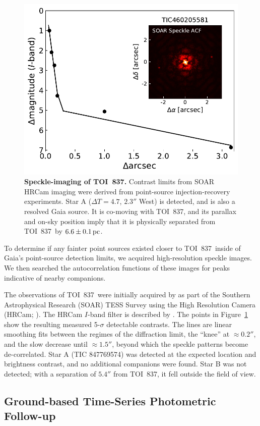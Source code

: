 \documentclass[12pt,twocolumn,tighten]{aastex63}
\newcommand{\tn}{TOI~837} %
\begin{document}
\begin{figure}[!t]
	\begin{center}
		\leavevmode
		\includegraphics[width=.44\textwidth]{f3.pdf}
	\end{center}
	\vspace{-0.7cm}
	\caption{
		{\bf Speckle-imaging of \tn.} Contrast limits from SOAR HRCam
		imaging were derived from point-source injection-recovery
		experiments. Star A ($\Delta T=4.7$, $2.3''$ West) is detected,
		and is also a resolved Gaia source.  It is co-moving with \tn, and
		its parallax and on-sky position imply that it is physically
		separated from \tn\ by $6.6\pm 0.1\,{\rm pc}$.
		\label{fig:speckle}
	}
\end{figure}

To determine if any fainter point sources existed closer to \tn\
inside of Gaia's point-source detection limits, we acquired
high-resolution speckle images. We then searched the autocorrelation
functions of these images for peaks indicative of nearby companions.

The observations of \tn\ were initially acquired by
\citet{ziegler_soar_2020} as part of the Southern Astrophysical
Research (SOAR) TESS Survey using the High Resolution Camera (HRCam;
\citealt{tokovinin_ten_2018}).  The HRCam $I$-band filter is described
by \citet{tokovinin_ten_2018}.  The points in Figure~\ref{fig:speckle}
show the resulting measured 5-$\sigma$ detectable contrasts.  The
lines are linear smoothing fits between the regimes of the diffraction
limit, the ``knee'' at $\approx 0.2''$, and the slow decrease until
$\approx 1.5''$, beyond which the speckle patterns become
de-correlated.  Star A (TIC 847769574) was detected at the expected
location and brightness contrast, and no additional companions were
found.  Star B was not detected; with a separation of $5.4''$ from
\tn, it fell outside the field of view.




\subsection{Ground-based Time-Series Photometric Follow-up}
\label{subsec:groundphot}
\end{document}
